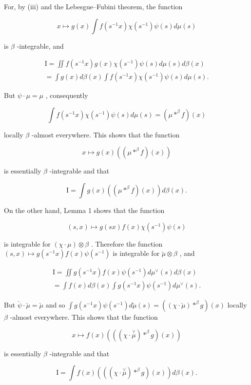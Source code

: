 For, by (iii) and the Lebesgue--Fubini theorem, the function

\[
x \mapsto g (x) \int f (s ^ {- 1} x) \chi (s ^ {- 1}) \psi (s) d \mu (s)
\]

is \(\beta\) -integrable, and

\[
\begin{array}{l} \mathrm{I} = \iint f (s ^ {- 1} x) g (x) \chi (s ^ {- 1}) \psi (s) d \mu (s) d \beta (x) \\ = \int g (x) d \beta (x) \int f (s ^ {- 1} x) \chi (s ^ {- 1}) \psi (s) d \mu (s). \end{array}
\]

But \(\psi \cdot \mu = \mu\) , consequently

\[
\int f (s ^ {- 1} x) \chi (s ^ {- 1}) \psi (s) d \mu (s) = (\mu * ^ {\beta} f) (x)
\]

locally \(\beta\) -almost everywhere. This shows that the function

\[
x \mapsto g (x) \left(\left(\mu * ^ {\beta} f\right) (x)\right)
\]

is essentially \(\beta\) -integrable and that

\[
\mathrm{I} = \int g (x) \left(\left(\mu * ^ {\beta} f\right) (x)\right) d \beta (x).
\]

On the other hand, Lemma 1 shows that the function

\[
(s, x) \mapsto g (s x) f (x) \chi (s ^ {- 1}) \psi (s)
\]

is integrable for \((\chi \cdot \mu) \otimes \beta\) . Therefore the function \((s, x) \mapsto g(s^{-1}x)f(x)\psi(s^{-1})\) is integrable for \(\breve{\mu} \otimes \beta\) , and

\[
\begin{array}{l} \mathrm{I} = \iint g (s ^ {- 1} x) f (x) \psi (s ^ {- 1}) d \mu^ {\vee} (s) d \beta (x) \\ = \int f (x) d \beta (x) \int g (s ^ {- 1} x) \psi (s ^ {- 1}) d \mu^ {\vee} (s). \end{array}
\]

But \(\check{\psi} \cdot \check{\mu} = \check{\mu}\) and so \(\int g(s^{-1}x)\psi(s^{-1})d\check{\mu}(s) = ((\chi \cdot \check{\mu}) *^{\beta}g)(x)\) locally \(\beta\) -almost everywhere. This shows that the function

\[
x \mapsto f (x) \left(\left((\chi \cdot \stackrel {\vee} {\mu}) * ^ {\beta} g\right) (x)\right)
\]

is essentially \(\beta\) -integrable and that

\[
\mathrm{I} = \int f (x) \left(\left(\left(\chi \cdot \stackrel {\vee} {\mu}\right) * ^ {\beta} g\right) (x)\right) d \beta (x).
\]

